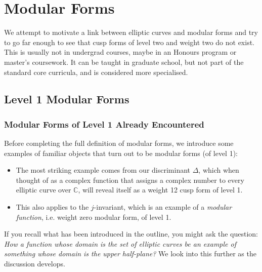 \documentclass{article}
\theoremstyle{definition}
\theoremstyle{definition}
\theoremstyle{definition}
\newcommand{\C}{\mathbb{C}}
\begin{document}
\section{Modular Forms}
We attempt to motivate a link between elliptic curves and modular forms and try to go far enough to see that cusp forms of level two and weight two do not exist.
\newline\newline
This is usually not in undergrad courses, maybe in an Honours program or master's coursework. It can be taught in graduate school, but not part of the standard core curricula, and is considered more specialised.
\newline\newline





\subsection{Level 1 Modular Forms}


\subsubsection{Modular Forms of Level 1 Already Encountered}
Before completing the full definition of modular forms, we introduce some examples of familiar objects that turn out to be modular forms (of level 1):

\begin{itemize}
    \item The most striking example comes from our discriminant $\Delta$, which when thought of as a complex function that assigns a complex number to every elliptic curve over $\C$, will reveal itself as a weight 12 cusp form of level 1.
    \item This also applies to the $j$-invariant, which is an example of a \emph{modular function}, i.e. weight zero modular form, of level 1.
\end{itemize}

If you recall what has been introduced in the outline, you might ask the question: \textit{How a function whose domain is the set of elliptic curves be an example of something whose domain is the upper half-plane?} We look into this further as the discussion develops.
\end{document}
